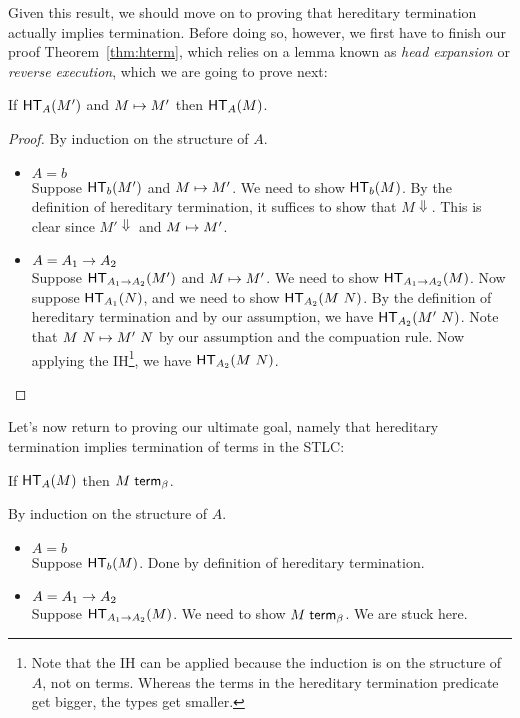 \documentclass{article}
\begin{document}
Given this result, we should move on to proving that hereditary termination actually implies
termination.  Before doing so, however, we first have to finish our proof
Theorem~\ref{thm:hterm}, which relies on a lemma known as \emph{head expansion} or
\emph{reverse execution}, which we are going to prove next:

\begin{lemma}\label{lem:hexp}
  If $\mathsf{HT}_{A}(M')$ and $M \mapsto M'$ then $\mathsf{HT}_{A}(M)$.
\end{lemma}

\begin{proof}
  By induction on the structure of $A$.
  \begin{itemize}
  \setlength\itemsep{1em}
  \item $A = b$\\
    Suppose $\mathsf{HT}_{b}(M')$ and $M \mapsto M'$. We need to show $\mathsf{HT}_{b}(M)$. By the
    definition of hereditary termination, it suffices to show that $M \Downarrow$.
    This is clear since $M' \Downarrow$ and $M \mapsto M'$.
  \item $A = A_1 \to A_2$\\
    Suppose $\mathsf{HT}_{A_1 \to A_2}(M')$ and $M \mapsto M'$. We need to show $\mathsf{HT}_{A_1 \to A_2}(M)$.
    Now suppose $\mathsf{HT}_{A_1}(N)$, and we need to show $\mathsf{HT}_{A_2}(M\ N)$.
    By the definition of hereditary termination and by our assumption, we have $\mathsf{HT}_{A_2}(M'\ N)$.
    Note that $M\ N \mapsto M'\ N$ by our assumption and the compuation rule.
    Now applying the IH\footnote{Note that the IH can be applied because the induction is on
      the structure of $A$, not on terms.  Whereas the terms in the hereditary termination
      predicate get bigger, the types get smaller.}, we have $\mathsf{HT}_{A_2}(M\ N)$.
    \qedhere
  \end{itemize}
\end{proof}

Let's now return to proving our ultimate goal, namely that hereditary termination implies termination of terms in the STLC:

\begin{theorem}[Termination]\label{thm:term}
  If $\mathsf{HT}_{A}(M)$ then ${M} \; \mathsf{term}_{\beta}$.
\end{theorem}

\begin{proofattempt}
  By induction on the structure of $A$.
   \begin{itemize}
  \setlength\itemsep{1em}
  \item $A = b$\\
    Suppose $\mathsf{HT}_{b}(M)$. Done by definition of hereditary termination.
  \item $A = A_1 \to A_2$\\
    Suppose $\mathsf{HT}_{A_1 \to A_2}(M)$. We need to show ${M} \; \mathsf{term}_{\beta}$. We are stuck here.
  \end{itemize}
\end{proofattempt}
\end{document}
